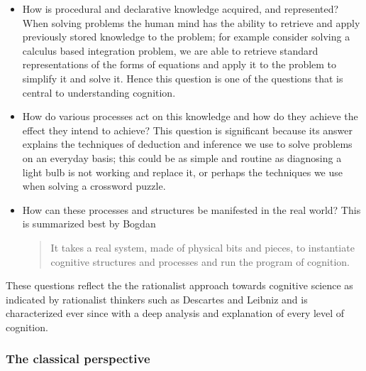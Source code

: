 \begin{itemize}
\item How is procedural and declarative knowledge acquired, and
represented? When solving problems the human mind has the ability to
retrieve and apply previously stored knowledge to the problem; for
example consider solving a calculus based integration problem, we are
able to retrieve standard representations of the forms of equations
and apply it to the problem to simplify it and solve it. Hence this
question is one of the questions that is central to understanding
cognition.
\item How do various processes act on this knowledge and how do they
achieve the effect they intend to achieve? This question is
significant because its answer explains the techniques of deduction
and inference we use to solve
problems on an everyday basis; this could be as simple and routine as diagnosing a
light bulb is not working and replace it, or perhaps the techniques we
use when solving a crossword puzzle.
\item How can these processes and structures be manifested in the real
world? This is summarized best by Bogdan\cite{Bogdan:1993aa}
\begin{quote}
It takes a real system, made of physical bits and pieces, to 
instantiate cognitive structures and processes and run the program of 
cognition.
\end{quote}

\end{itemize}

These questions reflect the the rationalist \cite{Bogdan:1993aa}
approach towards cognitive  
science as indicated by rationalist thinkers such as Descartes and
Leibniz  and is characterized ever since with a
deep analysis and explanation of every level of cognition.  




\subsubsection{The classical perspective}

